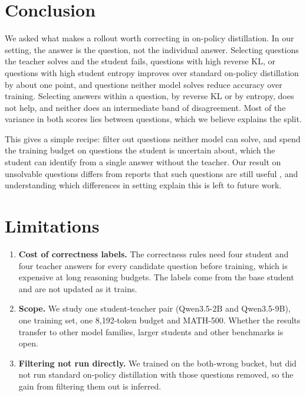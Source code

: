 \documentclass[11pt]{article}
\begin{document}
\section{Conclusion}
\label{sec:conclusion}

We asked what makes a rollout worth correcting in on-policy distillation.
In our setting, the answer is the question, not the individual answer.
Selecting questions the teacher solves and the student fails, questions with high reverse KL, or questions with high student entropy improves over standard on-policy distillation by about one point, and questions neither model solves reduce accuracy over training.
Selecting answers within a question, by reverse KL or by entropy, does not help, and neither does an intermediate band of disagreement.
Most of the variance in both scores lies between questions, which we believe explains the split.

This gives a simple recipe: filter out questions neither model can solve, and spend the training budget on questions the student is uncertain about, which the student can identify from a single answer without the teacher.
Our result on unsolvable questions differs from reports that such questions are still useful \citep{hou2026whatmatters,li2026everycoin}, and understanding which differences in setting explain this is left to future work.

\section*{Limitations}

\begin{enumerate}
\item \textbf{Cost of correctness labels.} The correctness rules need four student and four teacher answers for every candidate question before training, which is expensive at long reasoning budgets. The labels come from the base student and are not updated as it trains.
\item \textbf{Scope.} We study one student-teacher pair (Qwen3.5-2B and Qwen3.5-9B), one training set, one 8,192-token budget and MATH-500. Whether the results transfer to other model families, larger students and other benchmarks is open.
\item \textbf{Filtering not run directly.} We trained on the both-wrong bucket, but did not run standard on-policy distillation with those questions removed, so the gain from filtering them out is inferred.
\end{enumerate}
\end{document}
